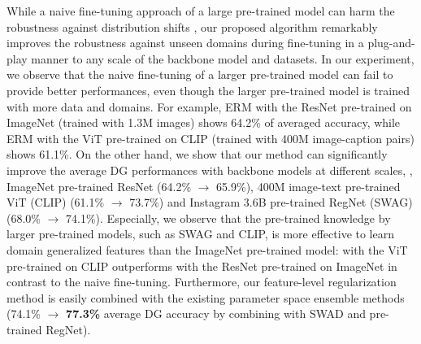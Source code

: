 While a naive fine-tuning approach of a large pre-trained model can harm the robustness against distribution shifts \cite{wortsman2021robust, kumar2022iclr_finetuning_distort}, our proposed algorithm remarkably improves the robustness against unseen domains during fine-tuning in a plug-and-play manner to any scale of the backbone model and datasets. 
In our experiment, we observe that the naive fine-tuning of a larger pre-trained model can fail to provide better performances, even though the larger pre-trained model is trained with more data and domains. For example, ERM with the ResNet pre-trained on ImageNet (trained with 1.3M images) shows 64.2\% of averaged accuracy, while ERM with the ViT pre-trained on CLIP (trained with 400M image-caption pairs) shows 61.1\%.
On the other hand, we show that our method can significantly improve the average DG performances with backbone models at different scales, \eg, ImageNet pre-trained ResNet (64.2\% $\rightarrow$ 65.9\%), 400M image-text pre-trained ViT (CLIP) \cite{radford2021clip} (61.1\% $\rightarrow$ 73.7\%) and Instagram 3.6B pre-trained RegNet (SWAG) \cite{singh2022swag} (68.0\% $\rightarrow$ 74.1\%). Especially, we observe that the pre-trained knowledge by larger pre-trained models, such as SWAG and CLIP, is more effective to learn domain generalized features than the ImageNet pre-trained model: \method{} with the ViT pre-trained on CLIP outperforms \method{} with the ResNet pre-trained on ImageNet in contrast to the naive fine-tuning.
Furthermore, our feature-level regularization method is easily combined with the existing parameter space ensemble methods \cite{cha2021swad, wortsman2021robust} (74.1\% $\rightarrow$ \textbf{77.3\%} average DG accuracy by combining with SWAD \cite{cha2021swad} and pre-trained RegNet).

